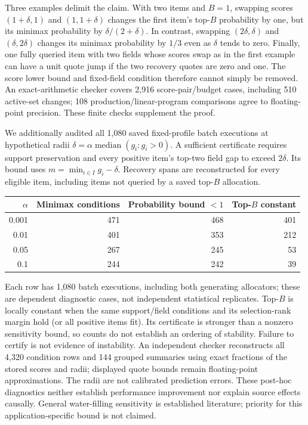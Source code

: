 \documentclass[11pt]{article}
\begin{document}
Three examples delimit the claim. With two items and $B=1$, swapping scores
$(1+\delta,1)$ and $(1,1+\delta)$ changes the first item's top-$B$ probability
by one, but its minimax probability by $\delta/(2+\delta)$. In contrast,
swapping $(2\delta,\delta)$ and $(\delta,2\delta)$ changes its minimax
probability by $1/3$ even as $\delta$ tends to zero. Finally, one fully queried
item with two fields whose scores swap as in the first example can have a
unit quote jump if the two recovery quotes are zero and one. The score lower
bound and fixed-field condition therefore cannot simply be removed.
An exact-arithmetic checker covers 2,916 score-pair/budget cases, including
510 active-set changes; 108 production/linear-program comparisons agree to
floating-point precision. These finite checks supplement the proof.

We additionally audited all 1,080 saved fixed-profile batch executions at
hypothetical radii $\delta=\alpha\operatorname{median}(g_i:g_i>0)$.
A sufficient certificate requires support preservation and every positive
item's top-two field gap to exceed $2\delta$. Its bound uses
$m=\min_{i\in I}g_i-\delta$. Recovery spans are reconstructed for every
eligible item, including items not queried by a saved top-$B$ allocation.
\begin{center}
\begin{tabular}{rrrr}
\toprule
$\alpha$ & Minimax conditions & Probability bound $<1$ & Top-$B$ constant\\
\midrule
0.001 & 471 & 468 & 401\\
0.01 & 401 & 353 & 212\\
0.05 & 267 & 245 & 53\\
0.1 & 244 & 242 & 39\\
\bottomrule
\end{tabular}
\end{center}
Each row has 1,080 batch executions, including both generating allocators;
these are dependent diagnostic cases, not independent statistical replicates.
Top-$B$ is locally constant when the same support/field conditions and its
selection-rank margin hold (or all positive items fit). Its certificate is
stronger than a nonzero sensitivity bound, so counts do not establish an
ordering of stability. Failure to certify is not evidence of instability.
An independent checker reconstructs all 4,320 condition rows and 144 grouped
summaries using exact fractions of the stored scores and radii; displayed
quote bounds remain floating-point approximations. The radii are not calibrated
prediction errors. These post-hoc diagnostics neither establish performance
improvement nor explain source effects causally. General water-filling
sensitivity is established literature; priority for this application-specific
bound is not claimed.
\end{document}
